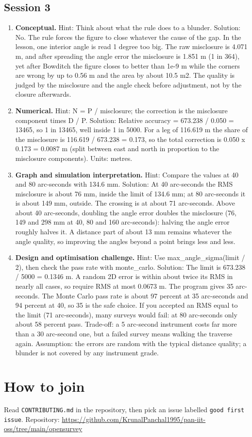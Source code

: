 \documentclass[11pt,a4paper]{article}
\begin{document}
\subsection*{Session 3}
\begin{enumerate}[nosep]
\item \textbf{Conceptual.} Hint: Think about what the rule does to a blunder. Solution: No. The rule forces the figure to close whatever the cause of the gap. In the lesson, one interior angle is read 1 degree too big. The raw misclosure is 4.071 m, and after spreading the angle error the misclosure is 1.851 m (1 in 364), yet after Bowditch the figure closes to better than 1e-9 m while the corners are wrong by up to 0.56 m and the area by about 10.5 m2. The quality is judged by the misclosure and the angle check before adjustment, not by the closure afterwards.
\item \textbf{Numerical.} Hint: N = P / misclosure; the correction is the misclosure component times D / P. Solution: Relative accuracy = 673.238 / 0.050 = 13465, so 1 in 13465, well inside 1 in 5000. For a leg of 116.619 m the share of the misclosure is 116.619 / 673.238 = 0.173, so the total correction is 0.050 x 0.173 = 0.0087 m (split between east and north in proportion to the misclosure components). Units: metres.
\item \textbf{Graph and simulation interpretation.} Hint: Compare the values at 40 and 80 arc-seconds with 134.6 mm. Solution: At 40 arc-seconds the RMS misclosure is about 76 mm, inside the limit of 134.6 mm; at 80 arc-seconds it is about 149 mm, outside. The crossing is at about 71 arc-seconds. Above about 40 arc-seconds, doubling the angle error doubles the misclosure (76, 149 and 298 mm at 40, 80 and 160 arc-seconds): halving the angle error roughly halves it. A distance part of about 13 mm remains whatever the angle quality, so improving the angles beyond a point brings less and less.
\item \textbf{Design and optimisation challenge.} Hint: Use max\_angle\_sigma(limit / 2), then check the pass rate with monte\_carlo. Solution: The limit is 673.238 / 5000 = 0.1346 m. A random 2D error is within about twice its RMS in nearly all cases, so require RMS at most 0.0673 m. The program gives 35 arc-seconds. The Monte Carlo pass rate is about 97 percent at 35 arc-seconds and 94 percent at 40, so 35 is the safe choice. If you accepted an RMS equal to the limit (71 arc-seconds), many surveys would fail: at 80 arc-seconds only about 58 percent pass. Trade-off: a 5 arc-second instrument costs far more than a 30 arc-second one, but a failed survey means walking the traverse again. Assumption: the errors are random with the typical distance quality; a blunder is not covered by any instrument grade.
\end{enumerate}

\section{How to join}
Read \texttt{CONTRIBUTING.md} in the repository, then pick an issue labelled \texttt{good first issue}. Repository: \url{https://github.com/KrunalPanchal1995/pan-iit-oss/tree/main/opensurvey}
\end{document}
